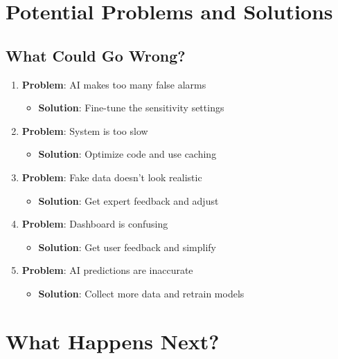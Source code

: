 \documentclass[12pt,a4paper]{article}
\begin{document}
\newpage

\section{Potential Problems and Solutions}

\subsection{What Could Go Wrong?}

\begin{enumerate}[leftmargin=*]
    \item \textbf{Problem}: AI makes too many false alarms
    \begin{itemize}
        \item \textbf{Solution}: Fine-tune the sensitivity settings
    \end{itemize}
    
    \item \textbf{Problem}: System is too slow
    \begin{itemize}
        \item \textbf{Solution}: Optimize code and use caching
    \end{itemize}
    
    \item \textbf{Problem}: Fake data doesn't look realistic
    \begin{itemize}
        \item \textbf{Solution}: Get expert feedback and adjust
    \end{itemize}
    
    \item \textbf{Problem}: Dashboard is confusing
    \begin{itemize}
        \item \textbf{Solution}: Get user feedback and simplify
    \end{itemize}
    
    \item \textbf{Problem}: AI predictions are inaccurate
    \begin{itemize}
        \item \textbf{Solution}: Collect more data and retrain models
    \end{itemize}
\end{enumerate}

\newpage

\section{What Happens Next?}
\end{document}
